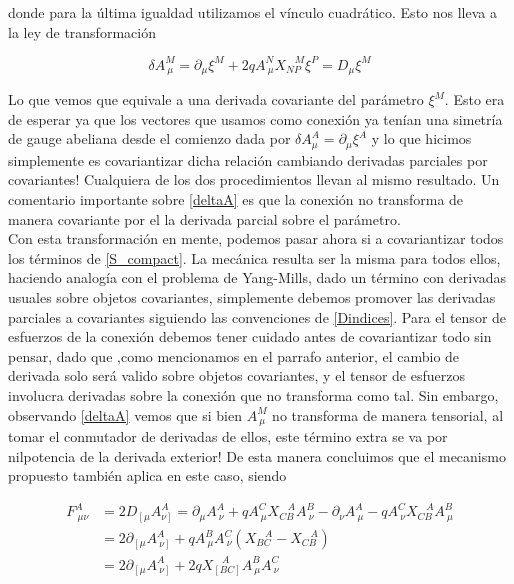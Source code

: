 \documentclass{article}
\numberwithin{equation}{section}
\begin{document}
donde para la última igualdad utilizamos el vínculo cuadrático. Esto nos lleva a la ley de transformación

\begin{boxquation}
	\begin{equation}\label{deltaA}
	\delta A^M_{\ \mu} = \partial_{\mu} \xi^M + 2q A^N_{\ \mu} X_{N P}^{\ \ \ \ M} \xi^P = D_{\mu} \xi^M 
	\end{equation}
\end{boxquation}

Lo que vemos que equivale a una derivada covariante del parámetro $ \xi^M $. Esto era de esperar ya que los vectores que usamos como conexión ya tenían una simetría de gauge abeliana desde el comienzo dada por $ \delta A^A_{\mu} = \partial_{\mu} \xi^A $ y lo que hicimos simplemente es covariantizar dicha relación cambiando derivadas parciales por covariantes! Cualquiera de los dos procedimientos llevan al mismo resultado. Un comentario importante sobre \ref{deltaA} es que la conexión no transforma de manera covariante por el la derivada parcial sobre el parámetro.\\



Con esta transformación en mente, podemos pasar ahora si a covariantizar todos los términos de \ref{S_compact}. La mecánica resulta ser la misma para todos ellos, haciendo analogía con el problema de Yang-Mills, dado un término con derivadas usuales sobre objetos covariantes, simplemente debemos promover las derivadas parciales a covariantes siguiendo las convenciones de \ref{Dindices}. Para el tensor de esfuerzos de la conexión debemos tener cuidado antes de covariantizar todo sin pensar, dado que ,como mencionamos en el parrafo anterior, el cambio de derivada solo será valido sobre objetos covariantes, y el tensor de esfuerzos involucra derivadas sobre la conexión que no transforma como tal. Sin embargo, observando \ref{deltaA} vemos que si bien $ A^{M}_{\ \mu} $ no transforma de manera tensorial, al tomar el conmutador de derivadas de ellos, este término extra se va por nilpotencia de la derivada exterior! De esta manera concluimos que el mecanismo propuesto también aplica en este caso, siendo

\begin{equation}\label{Fgauged}
\begin{aligned}
F^A_{\ \mu \nu} &= 2 D_{\left[ \mu \right.} A^A_{\left. \nu\right]} = \partial_{\mu} A^A_{\ \nu} + q A^C_{\ \mu} X_{C B}^{\ \ \ \ A} A^B_{\ \nu} - \partial_{\nu} A^A_{\ \mu} - q A^C_{\ \nu} X_{C B}^{\ \ \ \ A} A^B_{\ \mu}\\
&= 2 \partial_{\left[ \mu\right.} A^A_{\ \left. \nu \right]} + q A^B_{\ \mu} A^C_{\ \nu} \left( X_{B C}^{\ \ \ \ A} - X_{C B}^{\ \ \ \ A} \right)\\
&= 2 \partial_{\left[ \mu\right.} A^A_{\ \left. \nu \right]} + 2 q X_{\left[B C\right]}^{\ \ \ \ A} A^B_{\ \mu} A^C_{\ \nu} 
\end{aligned}
\end{equation}
\end{document}
